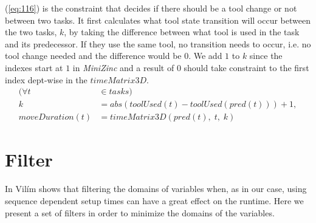   \noindent (\ref{eq:116}) is the constraint that decides if there should be a tool change or not between two tasks. It first calculates what tool state transition will occur between the two tasks, $k$, by taking the difference between what tool is used in the task and its predecessor. If they use the same tool, no transition needs to occur, i.e. no tool change needed and the difference would be $0$. We add $1$ to $k$ since the indexes start at $1$ in \emph{MiniZinc} and a result of $0$ should take constraint to the first index dept-wise in the $timeMatrix3D$.
 \begin{equation}\label{eq:116}
 \begin{aligned}
 (\forall t &\in tasks) \\
 k &= abs(toolUsed(t) - toolUsed(pred(t))) + 1, \\
 moveDuration(t) &= timeMatrix3D(pred(t), \; t, \; k)
 \end{aligned}
 \end{equation}
 
 
 \section{Filter}
  In \cite{VilimBartak2002Batch} \cite{Vilim2002Precedence} \cite{VilimBartak2002Sequence} Vilím shows that filtering the domains of variables when, as in our case, using sequence dependent setup times can have a great effect on the runtime. Here we present a set of filters in order to minimize the domains of the variables.
  
